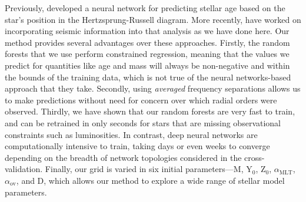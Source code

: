 \documentclass[manuscript,linenumbers]{aastex6}
\begin{document}
Previously, \citet{pulone1997age} developed a neural network for predicting stellar age based on the star's position in the Hertzsprung-Russell diagram. More recently, \citet{2016arXiv160200902V} have worked on incorporating seismic information into that analysis as we have done here. Our method provides several advantages over these approaches. Firstly, the random forests that we use perform constrained regression, meaning that the values we predict for quantities like age and mass will always be non-negative and within the bounds of the training data, which is not true of the neural networks-based approach that they take. Secondly, using \emph{averaged} frequency separations allows us to make predictions without need for concern over which radial orders were observed. Thirdly, we have shown that our random forests are very fast to train, and can be retrained in only seconds for stars that are missing observational constraints such as luminosities. In contrast, deep neural networks are computationally intensive to train, taking days or even weeks to converge depending on the breadth of network topologies considered in the cross-validation. Finally, our grid is varied in six initial parameters---M, Y$_0$, Z$_0$, $\alpha_{\text{MLT}}$, $\alpha_{\text{ov}}$, and D, which allows our method to explore a wide range of stellar model parameters.


\end{document}
